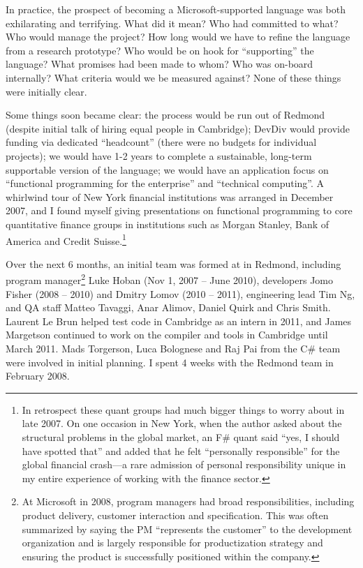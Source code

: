 \documentclass[acmsmall,screen]{acmart}
\begin{document}
In practice, the prospect of becoming a Microsoft-supported language was both exhilarating and terrifying. What did
it mean? Who had committed to what?  Who would manage the project? How long would we have to refine the
language from a research prototype?  Who would be on hook for “supporting” the language? What promises
had been made to whom? Who was on-board internally? What criteria would we be measured against?  None of these things were initially clear.  

Some things soon became clear: the process would be run out of Redmond (despite initial talk of hiring equal people in
Cambridge); DevDiv would provide funding via dedicated “headcount” (there were no budgets for individual projects); we
would have 1-2 years to complete a sustainable, long-term supportable version of the language; we would have an
application focus on “functional programming for the enterprise” and “technical computing”. A whirlwind tour of New York
financial institutions was arranged in December 2007, and I found myself giving presentations on functional programming
to core quantitative finance groups in institutions such as Morgan Stanley, Bank of America and
Credit Suisse.\footnote{In retrospect these quant groups had much bigger things to worry about in
late 2007. On one occasion in New York, when the author asked about the structural problems in the
global market, an F\# quant said “yes, I should have spotted that” and added that he felt “personally
responsible” for the global financial crash---a rare admission of personal responsibility unique in my entire
experience of working with the finance sector.}

Over the next 6 months, an initial team was formed at in Redmond, including program
manager\footnote{At Microsoft in 2008, program managers had broad responsibilities, including product delivery,
customer interaction and specification. This was often summarized by saying the PM “represents the customer” to
the development organization and is largely responsible for productization strategy and ensuring the product is
successfully positioned within the company.} Luke Hoban  (Nov 1, 2007 -- June 2010), developers
Jomo Fisher (2008 -- 2010) and Dmitry Lomov (2010 -- 2011), engineering lead Tim Ng, and QA staff Matteo Tavaggi, Anar Alimov, Daniel Quirk and
Chris Smith.  Laurent Le Brun helped test code in Cambridge as an intern in 2011, and James Margetson
continued to work on the compiler and tools in Cambridge until March 2011.  Mads Torgerson, Luca Bolognese
and Raj Pai from the C\# team were involved in initial planning. I spent 4 weeks with the Redmond team in February 2008.
\end{document}
